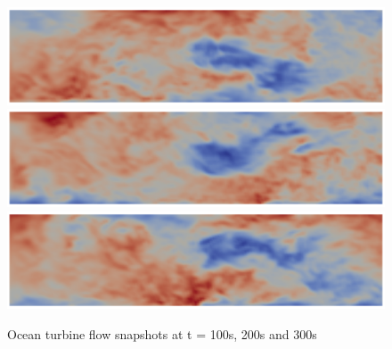 \begin{figure}
\centering
\includegraphics[width=\textwidth]{images/ocean-side-profile1}
\includegraphics[width=\textwidth]{images/ocean-side-profile2}
\includegraphics[width=\textwidth]{images/ocean-side-profile3}
\caption{Ocean turbine flow snapshots at t = 100s, 200s and 300s}
\label{fig:ocean-side-profile}
\end{figure}

